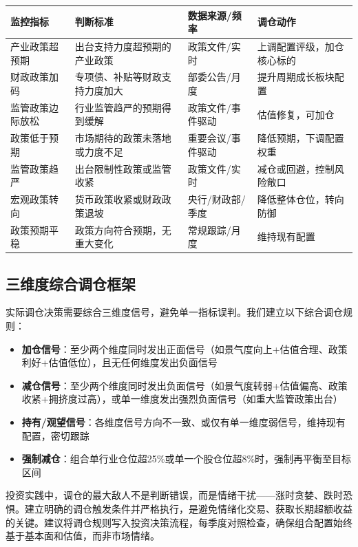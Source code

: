 \begin{exhibitbox}[表8-8：政策维度监控指标与触发条件]
\centering
\footnotesize
\setlength{\tabcolsep}{3pt}
\setlength{\aboverulesep}{0pt}
\setlength{\belowrulesep}{0pt}
\begin{tabularx}{\linewidth}{L{2.6cm} L{3.4cm} L{2.4cm} X}
\toprule
\textbf{监控指标} & \textbf{判断标准} & \textbf{数据来源/频率} & \textbf{调仓动作} \\
\midrule
{}
产业政策超预期 & 出台支持力度超预期的产业政策 & 政策文件/实时 & 上调配置评级，加仓核心标的 \\
财政政策加码 & 专项债、补贴等财政支持力度加大 & 部委公告/月度 & 提升周期成长板块配置 \\
监管政策边际放松 & 行业监管趋严的预期得到缓解 & 政策文件/事件驱动 & 估值修复，可加仓 \\
\midrule
{}
政策低于预期 & 市场期待的政策未落地或力度不足 & 重要会议/事件驱动 & 降低预期，下调配置权重 \\
监管政策趋严 & 出台限制性政策或监管收紧 & 政策文件/实时 & 减仓或回避，控制风险敞口 \\
宏观政策转向 & 货币政策收紧或财政政策退坡 & 央行/财政部/季度 & 降低整体仓位，转向防御 \\
\midrule
{}
政策预期平稳 & 政策方向符合预期，无重大变化 & 常规跟踪/月度 & 维持现有配置 \\
\bottomrule
\end{tabularx}
\end{exhibitbox}

\subsection{三维度综合调仓框架}

实际调仓决策需要综合三维度信号，避免单一指标误判。我们建立以下综合调仓规则：

\vspace{0.2em}
\begin{itemize}[leftmargin=2em]
\item \textbf{加仓信号}：至少两个维度同时发出正面信号（如景气度向上+估值合理、政策利好+估值低位），且无任何维度发出负面信号
\item \textbf{减仓信号}：至少两个维度同时发出负面信号（如景气度转弱+估值偏高、政策收紧+拥挤度过高），或单一维度发出强烈负面信号（如重大监管政策出台）
\item \textbf{持有/观望信号}：各维度信号方向不一致、或仅有单一维度弱信号，维持现有配置，密切跟踪
\item \textbf{强制减仓}：组合单行业仓位超25\%或单一个股仓位超8\%时，强制再平衡至目标区间
\end{itemize}

\begin{keyinsight}[调仓纪律比调仓判断更重要]
投资实践中，调仓的最大敌人不是判断错误，而是情绪干扰——涨时贪婪、跌时恐惧。建立明确的调仓触发条件并严格执行，是避免情绪化交易、获取长期超额收益的关键。建议将调仓规则写入投资决策流程，每季度对照检查，确保组合配置始终基于基本面和估值，而非市场情绪。
\end{keyinsight}

